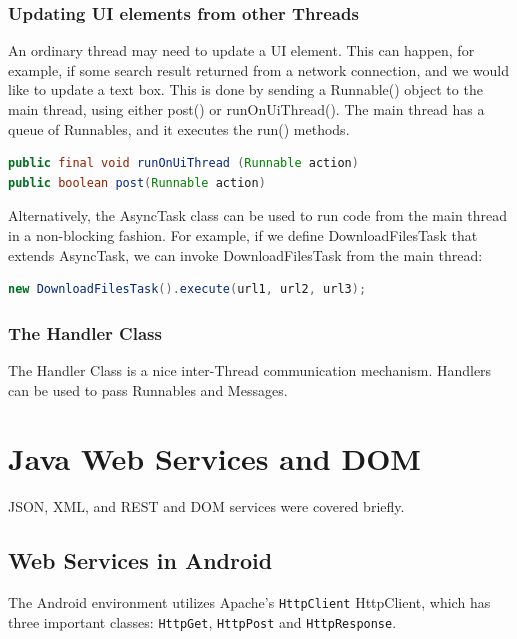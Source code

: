 \documentclass{article}
\def\cw#1{\texttt{#1}}
\begin{document}
\subsubsection{Updating UI elements from other Threads}

An ordinary thread may need to update a UI element. This can happen, for example, if some search result returned from a network connection, and we would like to update a text box. This is done by sending a Runnable() object to the main thread, using either post() or runOnUiThread(). The main thread has a queue of Runnables, and it executes the run() methods.

\begin{code} \begin{lstlisting}[language=Java]
public final void runOnUiThread (Runnable action)
public boolean post(Runnable action)
\end{lstlisting} \end{code}

Alternatively, the AsyncTask class can be used to run code from the main thread in a non-blocking fashion. For example, if  we define DownloadFilesTask that extends AsyncTask, we can invoke DownloadFilesTask from the main thread:

\begin{code} \begin{lstlisting}[language=Java]
new DownloadFilesTask().execute(url1, url2, url3);
\end{lstlisting} \end{code}

\subsubsection{The Handler Class}
The Handler Class is a nice inter-Thread communication mechanism. Handlers can be used to pass Runnables and Messages. 



\section{Java Web Services and DOM}
JSON, XML, and REST and DOM services were covered briefly.

\subsection{Web Services in Android}

The Android environment utilizes Apache's \cw{HttpClient} HttpClient, which has three important classes: \cw{HttpGet}, \cw{HttpPost} and \cw{HttpResponse}. 
\end{document}
